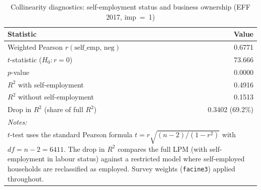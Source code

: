 \begin{table}[!h]

\caption{\label{tab:collin_self_emp}Collinearity diagnostics: self-employment status and business ownership (EFF 2017, imp~=~1)}
\centering
\begin{tabular}[t]{lr}
\toprule
Statistic & Value\\
\midrule
Weighted Pearson $r(\text{self\_emp},\,\text{neg})$ & 0.6771\\
\quad $t$-statistic ($H_0\colon r = 0$) & 73.666\\
\quad $p$-value & 0.0000\\
$R^2$ with self-employment & 0.4916\\
$R^2$ without self-employment & 0.1513\\
\addlinespace
Drop in $R^2$ (share of full $R^2$) & 0.3402 (69.2\%)\\
\bottomrule
\multicolumn{2}{l}{\rule{0pt}{1em}\textit{Notes: }}\\
\multicolumn{2}{l}{\rule{0pt}{1em}$t$-test uses the standard Pearson formula $t = r\sqrt{(n-2)/(1-r^2)}$ with $df = n - 2 = 6411$. The drop in $R^2$ compares the full LPM (with self-employment in labour status) against a restricted model where self-employed households are reclassified as employed. Survey weights (\texttt{facine3}) applied throughout.}\\
\end{tabular}
\end{table}
